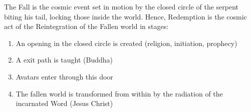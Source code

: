 The Fall is the cosmic event set in motion by the closed circle of the serpent biting his tail, locking those inside the world. Hence, Redemption is the cosmic act of the Reintegration of the Fallen world in stages:

\begin{enumerate}
\item An opening in the closed circle is created (religion, initiation, prophecy) 
\item A exit path is taught (Buddha) 
\item Avatars enter through this door 
\item The fallen world is transformed from within by the radiation of the incarnated Word (Jesus Christ) 
\end{enumerate}


